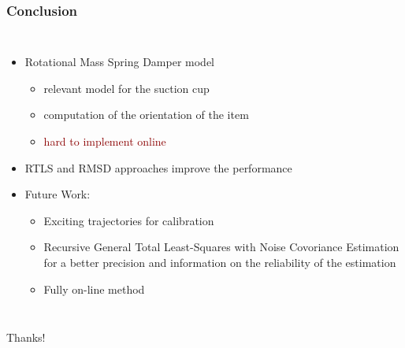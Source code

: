 \documentclass[aspectratio=1610]{beamer}
\begin{document}
\begin{frame}
\frametitle{Conclusion}
\begin{columns}
\column{37em}
\begin{itemize}\itemsep1em
  \justifying
  \item Rotational Mass Spring Damper model
  \begin{itemize}
    \item \textcolor{TextGreen}{relevant model for the suction cup}
    \item \textcolor{TextGreen}{computation of the orientation of the item}
    \item \textcolor{darkred}{hard to implement online}
  \end{itemize}
  \item RTLS and RMSD approaches improve the performance
  \item Future Work:
  \begin{itemize}
    \item Exciting trajectories for calibration
    \item Recursive General Total Least-Squares with Noise Covoriance Estimation for a better precision and information on the reliability of the estimation
    \item Fully on-line method
  \end{itemize}
\end{itemize}

\end{columns}
\end{frame}

\begin{frame}
\begin{columns}
\column{37em}
\vspace{1cm}
\Huge{\centerline{Thanks!}}
\end{columns}
\end{frame}

\end{document}
